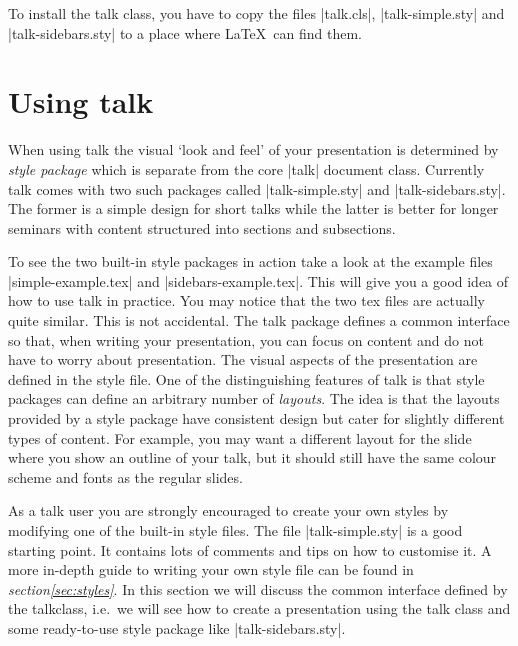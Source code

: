 \documentclass[12pt]{ltxdoc}
\newcommand{\mref}[2]{\textsl{#1\space\ref{#2}}}
\newcommand{\pkg}[1]{\textsf{#1}}
\begin{document}
To install the \pkg{talk} class, you have to copy the files |talk.cls|,
|talk-simple.sty| and |talk-sidebars.sty| to a place where \LaTeX\ can find
them.
%
%
%
\section{Using \pkg{talk}}
%
%
When using \pkg{talk} the visual `look and feel' of your presentation is
determined by \emph{style package} which is separate from the core |talk|
document class. Currently \pkg{talk} comes with two such packages called
|talk-simple.sty| and |talk-sidebars.sty|. The former is a simple design for
short talks while the latter is better for longer seminars with content
structured into sections and subsections.

To see the two built-in style packages in action take a look at the example
files |simple-example.tex| and |sidebars-example.tex|. This will give you a
good idea of how to use \pkg{talk} in practice. You may notice that the two tex
files are actually quite similar. This is not accidental. The \pkg{talk}
package defines a common interface so that, when writing your presentation, you
can focus on content and do not have to worry about presentation. The visual
aspects of the presentation are defined in the style file. One of the
distinguishing features of \pkg{talk} is that style packages can define an
arbitrary number of \emph{layouts}. The idea is that the layouts provided by a
style package have consistent design but cater for slightly different types of
content. For example, you may want a different layout for the slide where you
show an outline of your talk, but it should still have the same colour scheme
and fonts as the regular slides.

As a \pkg{talk} user you are strongly encouraged to create your own styles by
modifying one of the built-in style files. The file |talk-simple.sty| is a good
starting point. It contains lots of comments and tips on how to customise it. A
more in-depth guide to writing your own style file can be found in
\mref{section}{sec:styles}. In this section we will discuss the common interface
defined by the \pkg{talk}class, i.e.\ we will see how to create a
presentation using the \pkg{talk} class and some ready-to-use style package
like |talk-sidebars.sty|.
\end{document}
